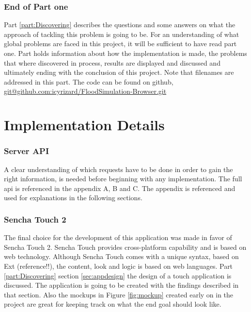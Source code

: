 
\section*{End of Part one}
Part \ref{part:Discovering} describes the questions and some answers on what the approach of tackling this problem is going to be. For an understanding of what global problems are faced in this project, it will be sufficient to have read part one. Part \ref{part:implementation} holds information about how the implementation is made, the problems that where discovered in process, results are displayed and discussed and ultimately ending with the conclusion of this project. Note that filenames are addressed in this part. The code can be found on github, \url{git@github.com:icyrizard/FloodSimulation-Browser.git}

\part{Implementation Details}
\label{part:implementation}
\section{Server API}
A clear understanding of which requests have to be done in order to gain the right information, is needed before beginning with any implementation. The full api is referenced in the appendix A, B and C. The appendix is referenced and used for explanations in the following sections.

\section{Sencha Touch 2}
The final choice for the development of this application was made in favor of Sencha Touch 2.  Sencha Touch provides cross-platform capability and is based on web technology. Although Sencha Touch comes with a unique syntax, based on Ext (reference!!), the content, look and logic is based on web languages.
Part \ref{part:Discovering} section \ref{sec:appdesign} the design of a touch application is discussed. The application is going to be created with the findings described in that section. Also the mockups in Figure \ref{fig:mockup} created early on in the project are great for keeping track on what the end goal should look like. 

